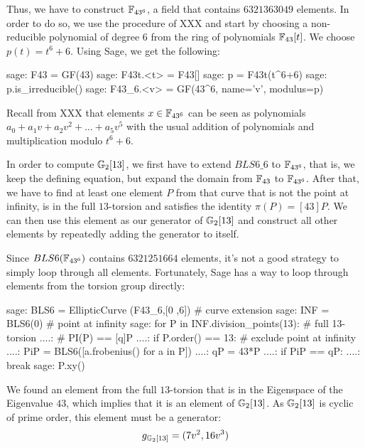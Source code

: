 Thus, we have to construct $\mathbb{F}_{43^6}$, a field that contains $6321363049$ elements. In order to do so, we use the procedure of XXX and start by choosing a non-reducible polynomial of degree $6$ from the ring of polynomials $\mathbb{F}_{43}[t]$. We choose $p(t) = t^6+6$. Using Sage, we get the following:
\begin{sagecommandline}
sage: F43 = GF(43)
sage: F43t.<t> = F43[]
sage: p = F43t(t^6+6)
sage: p.is_irreducible()
sage: F43_6.<v> = GF(43^6, name='v', modulus=p)
\end{sagecommandline}

Recall from XXX that elements $x\in\mathbb{F}_{43^6}$ can be seen as polynomials $a_0+a_1v + a_2v^2+\ldots + a_5 v^5$ with the usual addition of polynomials and multiplication modulo $t^6+6$. 

In order to compute $\mathbb{G}_2[13]$, we first have to extend $BLS6\_6$ to $\mathbb{F}_{43^6}$, that is, we keep the defining equation, but expand the domain from $\mathbb{F}_{43}$ to $\mathbb{F}_{43^6}$. After that, we have to find at least one element $P$ from that curve that is not the point at infinity, is in the full $13$-torsion and  satisfies the identity $\pi(P) = [43]P$. We can then use this element as our generator of $\mathbb{G}_2[13]$ and construct all other elements by repeatedly adding the generator to itself.

Since $BLS6(\mathbb{F}_{43^6})$ contains $6321251664$ elements, it's not a good strategy to simply loop through all elements. Fortunately, Sage has a way to loop through elements from the torsion group directly:

\begin{sagecommandline}
sage: BLS6 = EllipticCurve (F43_6,[0 ,6]) # curve extension
sage: INF = BLS6(0) # point at infinity
sage: for P in INF.division_points(13): # full 13-torsion
....: # PI(P) == [q]P
....:     if P.order() == 13: # exclude point at infinity
....:         PiP = BLS6([a.frobenius() for a in P])
....:         qP = 43*P
....:         if PiP == qP:
....:             break
sage: P.xy()
\end{sagecommandline}

We found an element from the full $13$-torsion that is in the Eigenspace of the Eigenvalue $43$, which implies that it is an element of $\mathbb{G}_2[13]$. As $\mathbb{G}_2[13]$ is cyclic of prime order, this element must be a generator:
\begin{equation}
g_{\mathbb{G}_2[13]} = (7v^2, 16v^3)
\end{equation}

